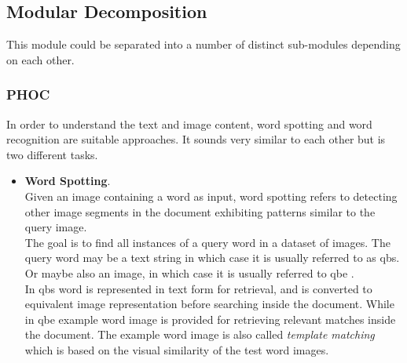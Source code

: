 \subsection{Modular Decomposition}
This module could be separated into a number of distinct sub-modules depending on each other. 

\subsubsection{PHOC} 
In order to understand the text and image content, word spotting and word recognition are suitable approaches. It sounds very similar to each other but is two different tasks.
\begin{itemize}[itemsep=1pt, topsep=5pt]
    \item \textbf{Word Spotting}. \\
    Given an image containing a word as input, word spotting refers to detecting other image segments in the document exhibiting patterns similar to the query image. \\
    The goal is to find all instances of a query word in a dataset of images. The query word may be a text string in which case it is usually referred to as \acrfull{qbs}. Or maybe also an image, in which case it is usually referred to \acrfull{qbe} \cite{WORDSPOTTING}. \\
    
    In \acrshort{qbs} word is represented in text form for retrieval, and is converted to equivalent image representation before searching inside the document. While in \acrshort{qbe} example word image is provided for retrieving relevant matches inside the document. The example word image is also called \emph{template matching} which is based on the visual similarity of the test word images.
    

\end{itemize}
